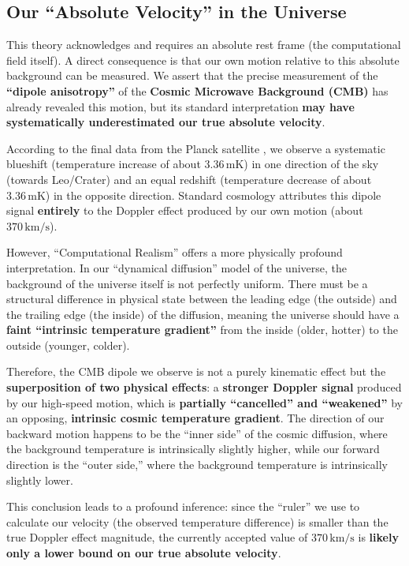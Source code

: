 \documentclass[11pt, a4paper]{article}
\begin{document}
\subsection{Our ``Absolute Velocity'' in the Universe}

This theory acknowledges and requires an absolute rest frame (the computational field itself). A direct consequence is that our own motion relative to this absolute background can be measured. We assert that the precise measurement of the \textbf{``dipole anisotropy''} of the \textbf{Cosmic Microwave Background (CMB)} has already revealed this motion, but its standard interpretation \textbf{may have systematically underestimated our true absolute velocity}.

According to the final data from the Planck satellite \cite{Planck2020}, we observe a systematic blueshift (temperature increase of about $3.36\,\mathrm{mK}$) in one direction of the sky (towards Leo/Crater) and an equal redshift (temperature decrease of about $3.36\,\mathrm{mK}$) in the opposite direction. Standard cosmology attributes this dipole signal \textbf{entirely} to the Doppler effect produced by our own motion (about $370\,\mathrm{km/s}$).

However, ``Computational Realism'' offers a more physically profound interpretation. In our ``dynamical diffusion'' model of the universe, the background of the universe itself is not perfectly uniform. There must be a structural difference in physical state between the leading edge (the outside) and the trailing edge (the inside) of the diffusion, meaning the universe should have a \textbf{faint ``intrinsic temperature gradient''} from the inside (older, hotter) to the outside (younger, colder).

Therefore, the CMB dipole we observe is not a purely kinematic effect but the \textbf{superposition of two physical effects}: a \textbf{stronger Doppler signal} produced by our high-speed motion, which is \textbf{partially ``cancelled'' and ``weakened''} by an opposing, \textbf{intrinsic cosmic temperature gradient}. The direction of our backward motion happens to be the ``inner side'' of the cosmic diffusion, where the background temperature is intrinsically slightly higher, while our forward direction is the ``outer side,'' where the background temperature is intrinsically slightly lower.

This conclusion leads to a profound inference: since the ``ruler'' we use to calculate our velocity (the observed temperature difference) is smaller than the true Doppler effect magnitude, the currently accepted value of $370\,\mathrm{km/s}$ is \textbf{likely only a lower bound on our true absolute velocity}.
\end{document}
